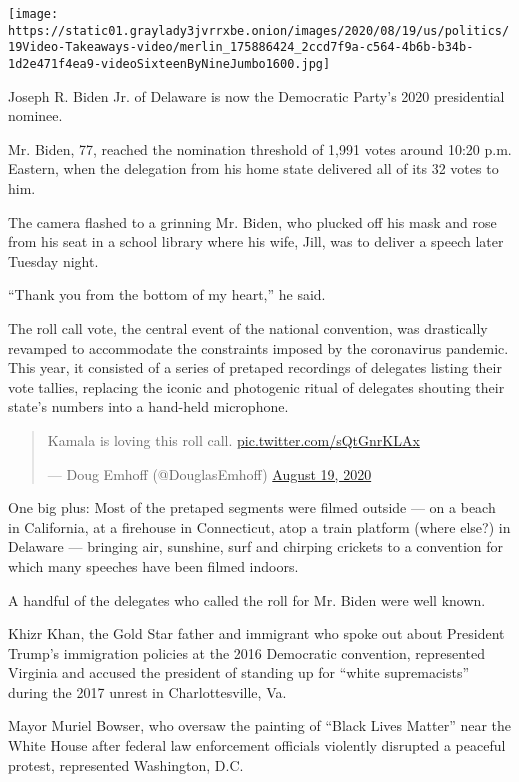 \texttt{[image: https://static01.graylady3jvrrxbe.onion/images/2020/08/19/us/politics/19Video-Takeaways-video/merlin\_175886424\_2ccd7f9a-c564-4b6b-b34b-1d2e471f4ea9-videoSixteenByNineJumbo1600.jpg]}

Joseph R. Biden Jr. of Delaware is now the Democratic Party's 2020
presidential nominee.

Mr. Biden, 77, reached the nomination threshold of 1,991 votes around
10:20 p.m. Eastern, when the delegation from his home state delivered
all of its 32 votes to him.

The camera flashed to a grinning Mr. Biden, who plucked off his mask and
rose from his seat in a school library where his wife, Jill, was to
deliver a speech later Tuesday night.

``Thank you from the bottom of my heart,'' he said.

The roll call vote, the central event of the national convention, was
drastically revamped to accommodate the constraints imposed by the
coronavirus pandemic. This year, it consisted of a series of pretaped
recordings of delegates listing their vote tallies, replacing the iconic
and photogenic ritual of delegates shouting their state's numbers into a
hand-held microphone.

\begin{quote}
Kamala is loving this roll call.
\href{https://t.co/sQtGnrKLAx}{pic.twitter.com/sQtGnrKLAx}

--- Doug Emhoff (@DouglasEmhoff)
\href{https://twitter.com/DouglasEmhoff/status/1295904487735988227?ref_src=twsrc\%5Etfw}{August
19, 2020}
\end{quote}

One big plus: Most of the pretaped segments were filmed outside --- on a
beach in California, at a firehouse in Connecticut, atop a train
platform (where else?) in Delaware --- bringing air, sunshine, surf and
chirping crickets to a convention for which many speeches have been
filmed indoors.

A handful of the delegates who called the roll for Mr. Biden were well
known.

Khizr Khan, the Gold Star father and immigrant who spoke out about
President Trump's immigration policies at the 2016 Democratic
convention, represented Virginia and accused the president of standing
up for ``white supremacists'' during the 2017 unrest in Charlottesville,
Va.

Mayor Muriel Bowser, who oversaw the painting of ``Black Lives Matter''
near the White House after federal law enforcement officials violently
disrupted a peaceful protest, represented Washington, D.C.

